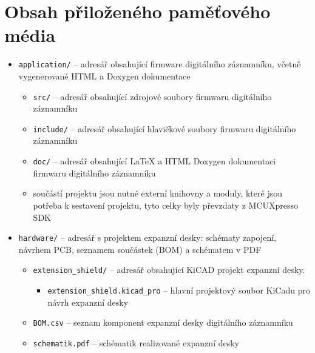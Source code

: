 
%

\chapter{Obsah přiloženého paměťového média}

\begin{itemize}
    \item \texttt{application/} -- adresář obsahující firmware digitálního záznamníku, včetně vygenerované HTML a Doxygen dokumentace
    \begin{itemize}
        \item \texttt{src/} -- adresář obsahující zdrojové soubory firmwaru digitálního záznamníku
        \item \texttt{include/} -- adresář obsahující hlavičkové soubory firmwaru digitálního záznamníku
        \item \texttt{doc/} -- adresář obsahující LaTeX a HTML Doxygen dokumentaci firmwaru digitálního záznamníku
        \item součástí projektu jsou nutné externí knihovny a moduly, které jsou potřeba k sestavení projektu, tyto celky byly převzdaty z MCUXpresso SDK
    \end{itemize}
    \item \texttt{hardware/} -- adresář s projektem expanzní desky: schématy zapojení, návrhem PCB, seznamem součástek (BOM) a schématem v PDF

    \begin{itemize}
        \item \texttt{extension\_shield/} -- adresář obsahující KiCAD projekt expanzní desky.
        \begin{itemize}
            \item \texttt{extension\_shield.kicad\_pro} -- hlavní projektový soubor KiCadu pro návrh expanzní desky
        \end{itemize}
        \item \texttt{BOM.csv} -- seznam komponent expanzní desky digitálního záznamníku
        \item \texttt{schematik.pdf} -- schématik realizované expanzní desky
    \end{itemize}


\end{itemize}
